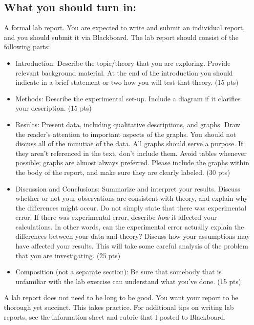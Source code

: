\documentclass[11pt,letterpaper]{article}
\begin{document}
\subsection*{What you should turn in:} A formal lab report. You are expected to write and submit an individual report, and you should submit it via Blackboard. The lab report should consist of the following parts:
\begin{itemize}
\item Introduction: Describe the topic/theory that you are exploring. Provide relevant background material. At the end of the introduction you should indicate in a brief statement or two how you will test that theory. (15 pts)
\item Methods: Describe the experimental set-up. Include a diagram if it clarifies your description. (15 pts)
\item Results: Present data, including qualitative descriptions, and graphs. Draw the reader's attention to
important aspects of the graphs. You should not discuss all of the minutiae of the data. All graphs should serve a purpose. If they aren't referenced in the text, don't include them. Avoid tables whenever possible; graphs are almost always preferred. Please include the graphs within the body of the report, and make sure they are clearly labeled. (30 pts)
\item Discussion and Conclusions: Summarize and interpret your results. Discuss whether or not your observations are consistent with theory, and explain why the differences might occur. Do not simply state that
there was experimental error. If there was experimental error, describe \textit{how} it affected your
calculations. In other words, can the experimental error actually explain the differences between your data and theory? Discuss how your assumptions may have affected your results. This will take some careful analysis of the problem that you are investigating. (25 pts)
\item Composition (not a separate section): Be sure that somebody that is unfamiliar with the lab exercise can understand what you've done. (15 pts)
\end{itemize}


A lab report does not need to be long to be good. You want your report to be thorough yet succinct. This takes practice. For additional tips on writing lab reports, see the information sheet  and rubric that I posted to Blackboard.\\
\end{document}
